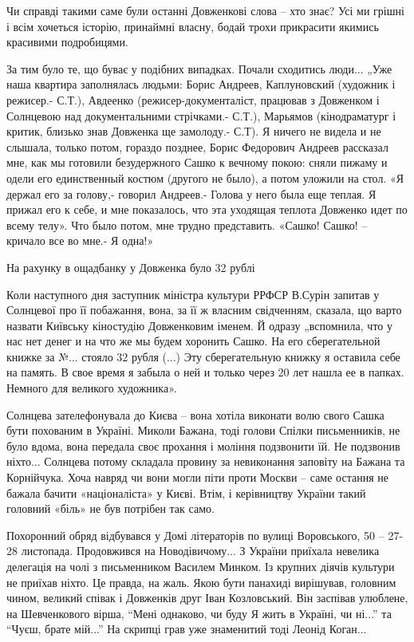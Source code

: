Чи справді такими саме були останні Довженкові слова – хто знає? Усі ми
грішні і всім хочеться історію, принаймні власну, бодай трохи прикрасити
якимись красивими подробицями. 

За тим було те, що буває у подібних випадках. Почали сходитись люди...
„Уже наша квартира заполнялась людьми: Борис Андреев, Каплуновский
(художник і режисер.- С.Т.), Авдеенко (режисер-документаліст, працював з
Довженком і Солнцевою над документальними стрічками.- С.Т.), Марьямов
(кінодраматург і критик, близько знав Довженка ще замолоду.- С.Т). Я
ничего не видела и не слышала, только потом, гораздо позднее, Борис
Федорович Андреев рассказал мне, как мы готовили безудержного Сашко к
вечному покою: сняли пижаму и одели его единственный костюм (другого не
было), а потом уложили на стол. «Я держал его за голову,- говорил
Андреев.- Голова у него была еще теплая. Я прижал его к себе, и мне
показалось, что эта уходящая теплота Довженко идет по всему телу». Что
было потом, мне трудно представить.  «Сашко! Сашко! – кричало все во мне.-
Я одна!»

На рахунку в ощадбанку у Довженка було 32 рублі

Коли наступного дня  заступник міністра культури РРФСР В.Сурін запитав у
Солнцевої про її побажання, вона, за її ж власним свідченням, сказала, що
варто назвати Київську кіностудію Довженковим іменем. Й одразу „вспомнила,
что у нас нет денег и на что же мы будем хоронить Сашко. На его
сберегательной книжке за №... стояло 32 рубля (...) Эту сберегательную
книжку  я оставила себе на память. В свое время я забыла о ней и только
через 20 лет нашла ее в папках. Немного для великого художника».  

Солнцева зателефонувала до Києва – вона хотіла виконати волю свого Сашка бути
похованим в Україні. Миколи Бажана, тоді голови Спілки письменників, не було
вдома, вона передала своє прохання і моління подзвонити їй. Не подзвонив
ніхто... Солнцева потому складала провину за невиконання заповіту на Бажана та
Корнійчука. Хоча навряд чи вони могли піти проти Москви – саме остання не
бажала бачити «націоналіста» у Києві. Втім, і керівництву України такий
головний «біль» не був потрібен так само. 

Похоронний обряд відбувався у Домі літераторів по вулиці Воровського, 50 –
27-28 листопада. Продовжився на Новодівичому... З України приїхала невелика
делегація на чолі з письменником Василем Минком. Із крупних діячів культури не
приїхав ніхто. Це правда, на жаль. Якою бути панахиді вирішував, головним
чином, великий співак і Довженків друг Іван Козловський. Він заспівав улюблене,
на Шевченкового вірша, \enquote{Мені однаково, чи буду Я жить в Україні, чи
ні...} та \enquote{Чуєш, брате мій...} На скрипці грав уже знаменитий тоді
Леонід Коган...

